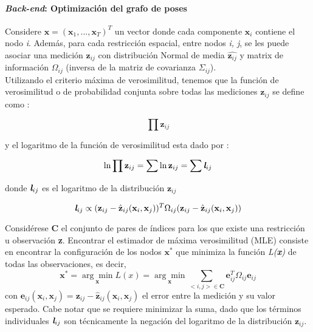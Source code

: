 \paragraph{\textit{Back-end}: Optimización del grafo de poses}

Considere $\textbf{x} = (\textbf{x}_{1}, ..., \textbf{x}_{T})^{T}$ un vector donde cada componente $\textbf{x}_{i}$ contiene el nodo \textsl{i}. Además, para cada restricción espacial, entre nodos \textsl{i, j}, se les puede asociar una medición $\textbf{z}_{ij}$ con distribución Normal de media $\hat{\textbf{z}_{ij}}$ y matrix de información $\Omega_{ij}$ (inversa de la matriz de covarianza $\Sigma_{ij}$). \\
Utilizando el criterio máxima de verosimilitud, tenemos que la función de verosimilitud o de probabilidad conjunta \cite{wiki-mle} sobre todas las mediciones $\textbf{z}_{ij}$ se define como :

\begin{equation}
\prod{\textbf{z}_{ij}}
\end{equation}

y el logaritmo de la función de verosimilitud esta dado por :

\begin{equation}
\ln \prod{\textbf{z}_{ij}} = \sum{\ln \textbf{z}_{ij}} = \sum{\textit{\textbf{l}}_{ij}}
\end{equation}

donde $\textit{\textbf{l}}_{ij}$ es el logaritmo de la distribución $\textbf{z}_{ij}$

\begin{equation}
\textit{\textbf{l}}_{ij} \propto (\textbf{z}_{ij}-\hat{\textbf{z}}_{ij}(\textbf{x}_{i},\textbf{x}_{j}))^{T}\Omega_{ij}(\textbf{z}_{ij}-\hat{\textbf{z}}_{ij}(\textbf{x}_{i},\textbf{x}_{j}))
\end{equation}

Considérese \textbf{C} el conjunto de pares de índices para los que existe una restricción u observación \textbf{z}. Encontrar el estimador de máxima verosimilitud (MLE) consiste en encontrar la configuración de los nodos $\textbf{x}^{*}$ que minimiza la función \textit{L(\textbf{x})} de todas las observaciones, es decir,
\begin{equation}
\textbf{x}^{*} = \underset{\textbf{x}}{\arg\min} L(x) = \underset{\textbf{x}}{\arg\min} \sum_{<i,j>\in \mathcal{\textbf{C}}}\textbf{e}_{ij}^{T}\Omega_{ij}\textbf{e}_{ij}
\end{equation}
con $\textbf{e}_{ij}(\textbf{x}_{i},\textbf{x}_{j})=\textbf{z}_{ij}-\hat{\textbf{z}}_{ij}(\textbf{x}_{i},\textbf{x}_{j})$ el error entre la medición y su valor esperado.
Cabe notar que se requiere minimizar la suma, dado que los términos individuales $\textit{\textbf{l}}_{ij}$ son técnicamente la negación del logaritmo de la distribución $\textbf{z}_{ij}$.

